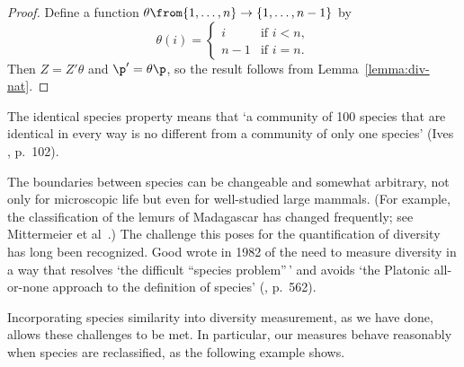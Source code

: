 \begin{proof}
Define a function $\theta \from \{1, \ldots, n\} \to \{1, \ldots, n - 1\}$
by
\[
\theta(i)
=
\begin{cases}
i       &\text{if } i < n,       \\
n - 1   &\text{if } i = n.
\end{cases}
\]
Then $Z = Z'\theta$ and $\p' = \theta\p$, so the result follows from
Lemma~\ref{lemma:div-nat}. 
\end{proof}

The identical species property means that `a community of 100 species that
are identical in every way is no different from a community of only one
species' (Ives~\cite{Ives}%
%
, 
%
p.~102).

The boundaries between species%
%
% 
can be changeable and somewhat arbitrary, not only for microscopic life but
even for well-studied large mammals.  (For example, the classification of
the lemurs of Madagascar has changed frequently; see Mittermeier et
al~\cite{MGKG}.)  The challenge this poses for the quantification of
diversity has long been recognized.  Good wrote in 1982 of the need to
measure diversity in a way that resolves `the difficult ``species
problem''\,' and avoids `the Platonic all-or-none approach to the
definition of species' (\cite{GoodDCM},%
%
%
p.~562).

Incorporating species similarity into diversity measurement, as we have
done, allows these challenges to be met.  In particular, our
measures behave reasonably when species are reclassified, as the following
example shows.

